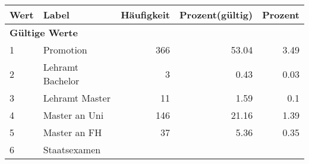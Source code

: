      \begin{longtable}{lXrrr}
     \toprule
     \textbf{Wert} & \textbf{Label} & \textbf{Häufigkeit} & \textbf{Prozent(gültig)} & \textbf{Prozent} \\
     \endhead
     \midrule
     \multicolumn{5}{l}{\textbf{Gültige Werte}}\\

     1 &
     \multicolumn{1}{X}{ Promotion   } &


       \num{366} &
       \num[round-mode=places,round-precision=2]{53,04} &
         \num[round-mode=places,round-precision=2]{3,49} \\

     2 &
     \multicolumn{1}{X}{ Lehramt Bachelor   } &


       \num{3} &
       \num[round-mode=places,round-precision=2]{0,43} &
         \num[round-mode=places,round-precision=2]{0,03} \\

     3 &
     \multicolumn{1}{X}{ Lehramt Master   } &


       \num{11} &
       \num[round-mode=places,round-precision=2]{1,59} &
         \num[round-mode=places,round-precision=2]{0,1} \\

     4 &
     \multicolumn{1}{X}{ Master an Uni   } &


       \num{146} &
       \num[round-mode=places,round-precision=2]{21,16} &
         \num[round-mode=places,round-precision=2]{1,39} \\

     5 &
     \multicolumn{1}{X}{ Master an FH   } &


       \num{37} &
       \num[round-mode=places,round-precision=2]{5,36} &
         \num[round-mode=places,round-precision=2]{0,35} \\

     6 &
     \multicolumn{1}{X}{ Staatsexamen   } &



\end{longtable}
